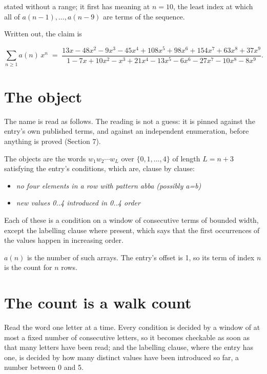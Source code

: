 \documentclass[11pt]{article}
\theoremstyle{definition}
\begin{document}
stated without a range; it first has meaning at $n = 10$, the least index at which all of $a(n-1),\dots,a(n-9)$ are terms of the sequence.

Written out, the claim is

\[\sum_{n \ge 1} a(n)\,x^n \;=\; \frac{13x - 48x^{2} - 9x^{3} - 45x^{4} + 108x^{5} + 98x^{6} + 154x^{7} + 63x^{8} + 37x^{9}}{1 - 7x + 10x^{2} - x^{3} + 21x^{4} - 13x^{5} - 6x^{6} - 27x^{7} - 10x^{8} - 8x^{9}}.\]

\section{The object}

The name is read as follows. The reading is not a guess: it is pinned against the entry's own published terms, and against an independent enumeration, before anything is proved (Section 7).

The objects are the words $w_1 w_2 \cdots w_L$ over $\{0,1,\dots,4\}$ of length $L = n + 3$ satisfying the entry's conditions, which are, clause by clause:

\begin{itemize}

\item {\itshape no four elements in a row with pattern abba (possibly a=b)}

\item {\itshape new values 0..4 introduced in 0..4 order}

\end{itemize}

Each of these is a condition on a window of consecutive terms of bounded width, except the labelling clause where present, which says that the first occurrences of the values happen in increasing order.

$a(n)$ is the number of such arrays. The entry's offset is 1, so its term of index $n$ is the count for $n$ rows.

\section{The count is a walk count}

Read the word one letter at a time. Every condition is decided by a window of at most a fixed number of consecutive letters, so it becomes checkable as soon as that many letters have been read; and the labelling clause, where the entry has one, is decided by how many distinct values have been introduced so far, a number between $0$ and 5.
\end{document}
